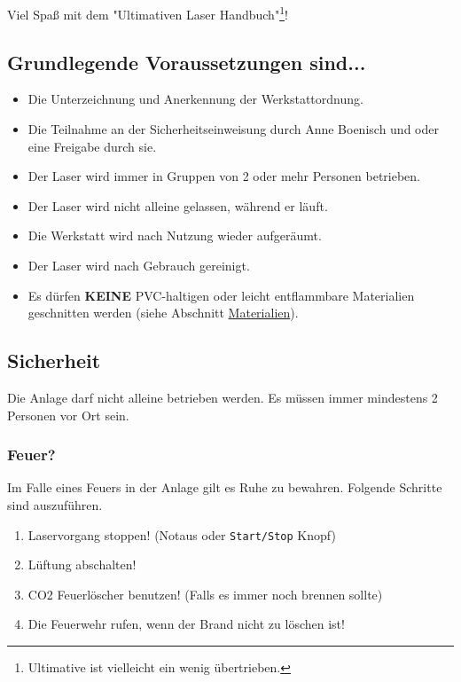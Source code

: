 \documentclass[]{article}
\providecommand{\tightlist}{%
  \setlength{\itemsep}{0pt}\setlength{\parskip}{0pt}}
\begin{document}
Viel Spaß mit dem "Ultimativen Laser Handbuch"\footnote{Ultimative ist
  vielleicht ein wenig übertrieben.}!

\hypertarget{grundlegende-voraussetzungen-sind...}{%
\subsection{Grundlegende Voraussetzungen
sind...}\label{grundlegende-voraussetzungen-sind...}}

\begin{itemize}
\tightlist
\item
  Die Unterzeichnung und Anerkennung der Werkstattordnung.
\item
  Die Teilnahme an der Sicherheitseinweisung durch Anne Boenisch und
  oder eine Freigabe durch sie.
\item
  Der Laser wird immer in Gruppen von 2 oder mehr Personen betrieben.\\
\item
  Der Laser wird nicht alleine gelassen, während er läuft.\\
\item
  Die Werkstatt wird nach Nutzung wieder aufgeräumt.\\
\item
  Der Laser wird nach Gebrauch gereinigt.\\
\item
  Es dürfen \textbf{KEINE} PVC-haltigen oder leicht entflammbare
  Materialien geschnitten werden (siehe Abschnitt
  \protect\hyperlink{materialien}{Materialien}).
\end{itemize}

\hypertarget{sicherheit}{%
\subsection{Sicherheit}\label{sicherheit}}

Die Anlage darf nicht alleine betrieben werden. Es müssen immer
mindestens 2 Personen vor Ort sein.

\hypertarget{feuer}{%
\subsubsection{Feuer?}\label{feuer}}

Im Falle eines Feuers in der Anlage gilt es Ruhe zu bewahren. Folgende
Schritte sind auszuführen.

\begin{enumerate}
\def\labelenumi{\arabic{enumi}.}
\tightlist
\item
  Laservorgang stoppen! (Notaus oder \texttt{Start/Stop} Knopf)
\item
  Lüftung abschalten!
\item
  CO2 Feuerlöscher benutzen! (Falls es immer noch brennen sollte)
\item
  Die Feuerwehr rufen, wenn der Brand nicht zu löschen ist!
\end{enumerate}
\end{document}
